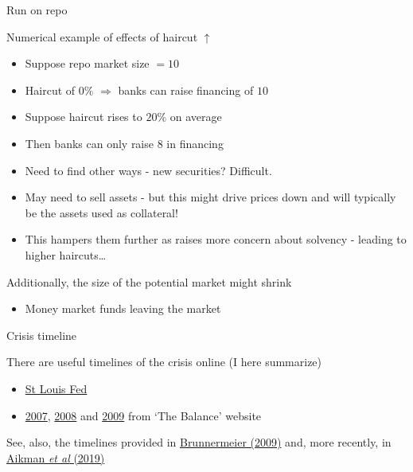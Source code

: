 \begin{frame}{Run on repo}

Numerical example of effects of haircut $\uparrow$
	\begin{itemize}
	\item	Suppose repo market size $= 10$
	\item	Haircut of $0\%$ $\Rightarrow$ banks can raise financing of $10$
	\item	Suppose haircut rises to $20\%$ on average
	\item	Then banks can only raise $8$ in financing
	\item	Need to find other ways - new securities? Difficult.
	\item	May need to sell assets - but this might drive prices down and will typically be the assets used as collateral!
	\item	This hampers them further as raises more concern about solvency - leading to higher haircuts\ldots
	\end{itemize}
\vspace{2mm}
Additionally, the size of the potential market might shrink
\begin{itemize}
\item	Money market funds leaving the market
\end{itemize}

\end{frame}



\begin{frame}{Crisis timeline}

There are useful timelines of the crisis online (I here summarize)
	\begin{itemize}
	\item	\href{https://www.stlouisfed.org/financial-crisis/full-timeline\#2008}{St Louis Fed}
	\item	\href{https://www.thebalance.com/2007-financial-crisis-overview-3306138}{2007}, \href{https://www.thebalance.com/2008-financial-crisis-timeline-3305540}{2008} and \href{https://www.thebalance.com/2009-financial-crisis-bailouts-3305539}{2009} from `The Balance' website
	\end{itemize}
\vspace{3mm}
See, also, the timelines provided in \href{https://www.princeton.edu/~markus/research/papers/liquidity_credit_crunch.pdf}{Brunnermeier (2009)} and, more recently, in \href{https://pubs.aeaweb.org/doi/pdfplus/10.1257/jep.33.1.107}{Aikman \emph{et al} (2019)}

\end{frame}

